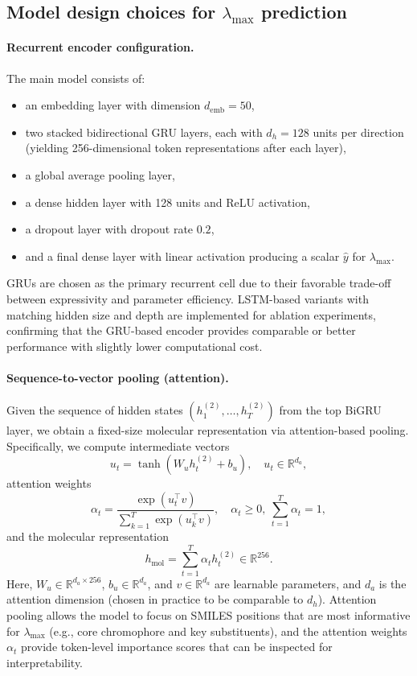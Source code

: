 \documentclass[11pt,a4paper]{article}
\begin{document}
\subsection{Model design choices for $\lambda_{\max}$ prediction}
\label{subsec:design_choices}

\paragraph{Recurrent encoder configuration.}
The main model consists of:
\begin{itemize}
  \item an embedding layer with dimension $d_{\mathrm{emb}} = 50$,
  \item two stacked bidirectional GRU layers, each with $d_h = 128$ units per direction (yielding 256-dimensional token representations after each layer),
  \item a global average pooling layer,
  \item a dense hidden layer with 128 units and ReLU activation,
  \item a dropout layer with dropout rate $0.2$,
  \item and a final dense layer with linear activation producing a scalar $\hat{y}$ for $\lambda_{\max}$.
\end{itemize}
GRUs are chosen as the primary recurrent cell due to their favorable trade-off between expressivity and parameter efficiency. LSTM-based variants with matching hidden size and depth are implemented for ablation experiments, confirming that the GRU-based encoder provides comparable or better performance with slightly lower computational cost.

\paragraph{Sequence-to-vector pooling (attention).}
Given the sequence of hidden states $(h_1^{(2)}, \dots, h_T^{(2)})$ from the top BiGRU layer, we obtain a fixed-size molecular representation via attention-based pooling. Specifically, we compute intermediate vectors
\begin{equation}
  u_t = \tanh(W_u h_t^{(2)} + b_u), \quad u_t \in \mathbb{R}^{d_a},
\end{equation}
attention weights
\begin{equation}
  \alpha_t = \frac{\exp(u_t^{\top} v)}{\sum_{k=1}^{T} \exp(u_k^{\top} v)}, \quad \alpha_t \geq 0,\ \sum_{t=1}^{T} \alpha_t = 1,
\end{equation}
and the molecular representation
\begin{equation}
  h_{\mathrm{mol}} = \sum_{t=1}^{T} \alpha_t h_t^{(2)} \in \mathbb{R}^{256}.
\end{equation}
Here, $W_u \in \mathbb{R}^{d_a \times 256}$, $b_u \in \mathbb{R}^{d_a}$, and $v \in \mathbb{R}^{d_a}$ are learnable parameters, and $d_a$ is the attention dimension (chosen in practice to be comparable to $d_h$). Attention pooling allows the model to focus on SMILES positions that are most informative for $\lambda_{\max}$ (e.g., core chromophore and key substituents), and the attention weights $\alpha_t$ provide token-level importance scores that can be inspected for interpretability.
\end{document}
